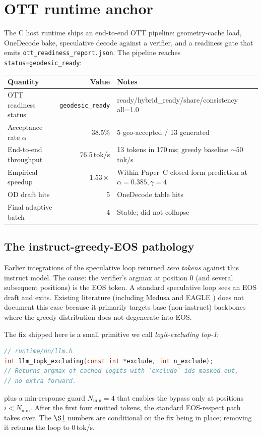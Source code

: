 \documentclass[11pt]{article}
\begin{document}
\section{OTT runtime anchor}
\label{sec:runtime}

The C host runtime ships an end-to-end OTT pipeline: geometry-cache load,
OneDecode bake, speculative decode against a verifier, and a readiness gate
that emits \texttt{ott\_readiness\_report.json}. The pipeline reaches
\texttt{status=geodesic\_ready}:

\begin{table}[h]
\centering\small
\begin{tabular}{lrl}
\toprule
\textbf{Quantity} & \textbf{Value} & \textbf{Notes}\\
\midrule
OTT readiness status & \texttt{geodesic\_ready} & ready/hybrid\_ready/share/consistency all=1.0\\
Acceptance rate $\alpha$ & 38.5\% & 5 geo-accepted / 13 generated\\
End-to-end throughput & 76.5\,tok/s & 13 tokens in 170\,ms; greedy baseline $\sim\!50$\,tok/s\\
Empirical speedup & $1.53\times$ & Within Paper~C closed-form prediction at $\alpha=0.385,\gamma=4$\\
OD draft hits & 5 & OneDecode table hits\\
Final adaptive batch & 4 & Stable; did not collapse\\
\bottomrule
\end{tabular}
\end{table}

\subsection{The instruct-greedy-EOS pathology}

Earlier integrations of the speculative loop returned \emph{zero tokens}
against this instruct model. The cause: the verifier's argmax at position 0
(and several subsequent positions) is the EOS token. A standard speculative
loop \cite{leviathan2023fast,chen2023accelerating} sees an EOS draft and
exits. Existing literature (including Medusa \cite{cai2024medusa} and
EAGLE \cite{li2024eagle}) does not document this case because it primarily
targets base (non-instruct) backbones where the greedy distribution does not
degenerate into EOS.

The fix shipped here is a small primitive we call \emph{logit-excluding
top-1}:
\begin{lstlisting}[language=C]
// runtime/nn/llm.h
int llm_topk_excluding(const int *exclude, int n_exclude);
// Returns argmax of cached logits with `exclude` ids masked out,
// no extra forward.
\end{lstlisting}
plus a min-response guard $N_{\min}=4$ that enables the bypass only at
positions $i<N_{\min}$. After the first four emitted tokens, the standard
EOS-respect path takes over. The $\S$\ref{sec:runtime} numbers are
conditional on the fix being in place; removing it returns the loop to
0\,tok/s.
\end{document}

